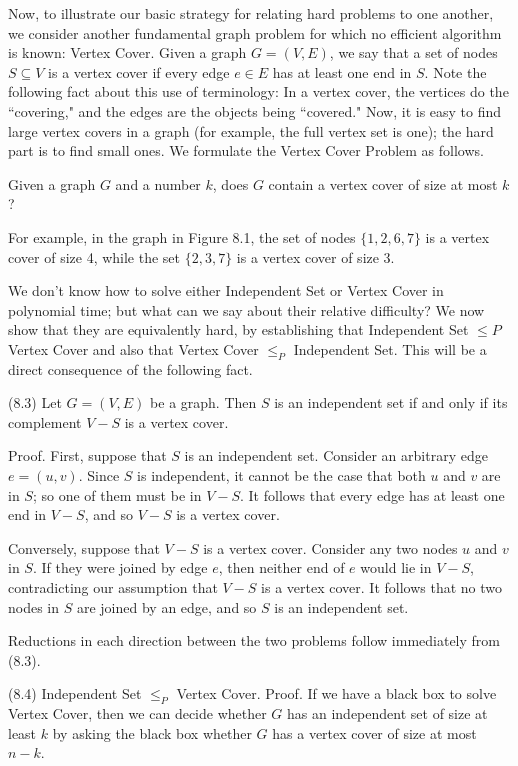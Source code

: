 \documentclass[a4paper, 12pt]{book}
\theoremstyle{dotless}
\begin{document}
Now, to illustrate our basic strategy for relating hard problems to one another, we consider another fundamental graph problem for which no efficient algorithm is known: Vertex Cover. Given a graph $G=(V, E)$, we say that a set of nodes $S \subseteq V$ is a vertex cover if every edge $e \in E$ has at least one end in $S$. Note the following fact about this use of terminology: In a vertex cover, the vertices do the ``covering," and the edges are the objects being ``covered." Now, it is easy to find large vertex covers in a graph (for example, the full vertex set is one); the hard part is to find small ones. We formulate the Vertex Cover Problem as follows.

Given a graph $G$ and a number $k$, does $G$ contain a vertex cover of size at most $k$?

For example, in the graph in Figure 8.1, the set of nodes $\{1,2,6,7\}$ is a vertex cover of size 4, while the set $\{2,3,7\}$ is a vertex cover of size 3.

We don't know how to solve either Independent Set or Vertex Cover in polynomial time; but what can we say about their relative difficulty? We now show that they are equivalently hard, by establishing that Independent Set $\leq P$ Vertex Cover and also that Vertex Cover $\leq_{P}$ Independent Set. This will be a direct consequence of the following fact.

(8.3) Let $G=(V, E)$ be a graph. Then $S$ is an independent set if and only if its complement $V-S$ is a vertex cover.

Proof. First, suppose that $S$ is an independent set. Consider an arbitrary edge $e=(u, v)$. Since $S$ is independent, it cannot be the case that both $u$ and $v$ are in $S$; so one of them must be in $V-S$. It follows that every edge has at least one end in $V-S$, and so $V-S$ is a vertex cover.

Conversely, suppose that $V-S$ is a vertex cover. Consider any two nodes $u$ and $v$ in $S$. If they were joined by edge $e$, then neither end of $e$ would lie in $V-S$, contradicting our assumption that $V-S$ is a vertex cover. It follows that no two nodes in $S$ are joined by an edge, and so $S$ is an independent set.

Reductions in each direction between the two problems follow immediately from (8.3).

(8.4) Independent Set $\leq_{P}$ Vertex Cover. Proof. If we have a black box to solve Vertex Cover, then we can decide whether $G$ has an independent set of size at least $k$ by asking the black box whether $G$ has a vertex cover of size at most $n-k$.
\end{document}
